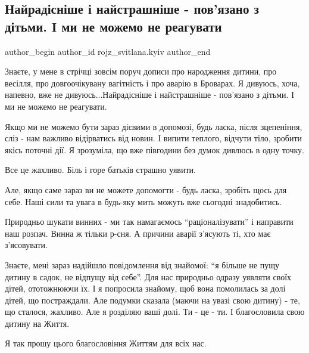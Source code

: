  
 
 
 
 

\subsection{Найрадісніше і найстрашніше - пов'язано з дітьми. І ми не можемо не реагувати}
\label{sec:18_01_2023.fb.rojz_svitlana.kyiv.1.nairad_sn_she___nais}

\ifcmt
 author_begin
   author_id rojz_svitlana.kyiv
 author_end
\fi


Знаєте, у мене в стрічці зовсім  поруч дописи про народження дитини, про
весілля, про довгоочікувану вагітність  і про аварію в Броварах. Я дивуюсь,
хоча, напевно, вже не дивуюсь...Найрадісніше і найстрашніше - пов'язано з
дітьми. І ми не можемо не реагувати. 

Якщо ми не можемо бути зараз дієвими в допомозі, будь ласка, після зцепеніння,
сліз - нам важливо відірватись від новин. І випити теплого, відчути тіло,
зробити якісь поточні дії. Я зрозуміла, що вже півгодини без думок дивлюсь в
одну точку. 

Все це жахливо. Біль і горе батьків страшно уявити. 

Але, якщо саме зараз ви не можете допомогти - будь ласка, зробіть щось для
себе. Наші сили та увага в будь-яку мить можуть вже сьогодні знадобитись. 

Природньо шукати винних - ми так намагаємось \enquote{раціоналізувати} і направити наш
розпач.  Винна ж тільки р-сня. А причини аварії з'ясують ті, хто має
з'ясовувати. 

Знаєте, мені зараз надійшло повідомлення від знайомої: \enquote{я більше не пущу дитину
в садок, не відпущу від себе}. Для нас природньо одразу уявляти своїх дітей,
ототожнюючи їх. І я попросила знайому, щоб вона помолилась за долі дітей, що
постраждали. Але подумки сказала (маючи на увазі свою дитину)  - те, що
сталося, жахливо. Але я розділяю ваші долі. Ти - це - ти. І благословила свою
дитину на Життя. 

Я так прошу цього благословіння Життям для всіх нас.

